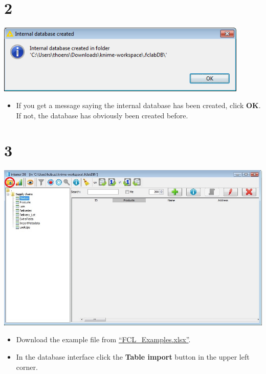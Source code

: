 \documentclass[10pt]{beamer}
\begin{document}
\section{2}
\begin{frame}
	\begin{center}
  		\includegraphics[width=0.9\textwidth]{2.png}
	\end{center}
	\begin{itemize}
		\item If you get a message saying the internal database has been created, click \textbf{OK}. If not, the database has obviously been created before.
	\end{itemize}
\end{frame}

\section{3}
\begin{frame}
	\begin{center}
  		\includegraphics[height=0.6\textheight]{3.png}
	\end{center}
	\begin{itemize}
		\item Download the example file from \textcolor{blue}{\underline{\href{https://github.com/SiLeBAT/BfROpenLabResources/raw/master/GitHubPages/documents/FCL\_Examples.xlsx}{``FCL\_Examples.xlsx''}}}.
		\item In the database interface click the \textbf{Table import} button in the upper left corner.
	\end{itemize}
\end{frame}
\end{document}
